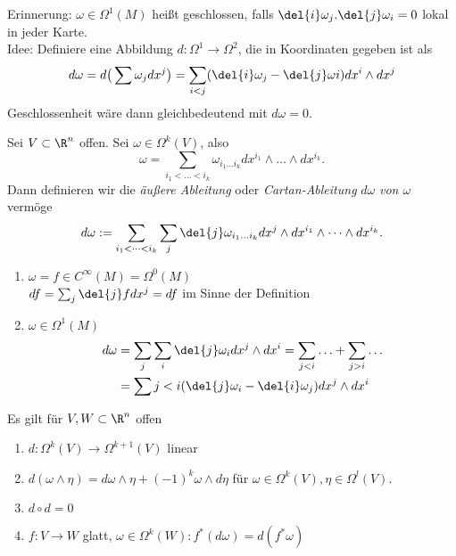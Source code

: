 Erinnerung: \lecture $ \omega \in \Omega^1(M) $ heißt geschlossen, falls $ \del{i}\omega_j . \del{j} \omega_i = 0 $ lokal in jeder Karte.\\
Idee: Definiere eine Abbildung $ d: \Omega^1 \to \Omega^2 $, die in Koordinaten gegeben ist als
\[ d\omega = d \big( \sum \omega_j dx^j \big) = \sum_{i < j} (\del{i} \omega_j - \del{j} \omega i) dx^i \wedge dx^j \]
Geschlossenheit wäre dann gleichbedeutend mit $d\omega = 0$.

\begin{defn}  \label{7.5}
	Sei $ V \subset \R^n $ offen. Sei $ \omega \in \Omega^k(V) $, also 
	\[ \omega = \sum_{i_1 < \dots < i_k} \omega_{i_1 \dots i_k} dx^{i_1} \wedge \dots \wedge dx^{i_k}. \]
	Dann definieren wir die \emph{äußere Ableitung} oder \emph{Cartan-Ableitung} $d\omega$ \emph{von $\omega$} vermöge
	\[ d\omega := \sum_{i_1 < \dots < i_k} \sum_j \del{j} \omega_{i_1 \dots i_k} dx^j \wedge dx^{i_1} \wedge \dots \wedge dx^{i_k}. \]
\end{defn}

\begin{rem*}
	\begin{enumerate}[label={\roman*})]
		\item $ \omega = f \in C^\infty(M) = \Omega^0(M) $\\
			$ df = \sum_j \del{j} f dx^j = df $ im Sinne der Definition
		\item $ \omega \in \Omega^1(M) $
			\begin{align*}
				d\omega &= \sum_j \sum_i \del{j}\omega_i dx^j \wedge dx^i = \sum_{j<i} \dotsc + \sum_{j > i} \dots\\
				&= \sum{j<i} (\del{j} \omega_i - \del{i}\omega_j) dx^j \wedge dx^i
			\end{align*}
	\end{enumerate}
\end{rem*}

\begin{lem}
	Es gilt für $ V,W \subset \R^n $ offen
	\begin{enumerate}[label={\roman*})]
		\item $ d: \Omega^k(V) \to \Omega^{k+1}(V) $ linear
		\item $ d(\omega \wedge \eta) = d\omega \wedge \eta + (-1)^k \omega \wedge d\eta $ für $ \omega \in \Omega^k(V), \eta \in \Omega^l(V). $
		\item $d \circ d = 0$
		\item $ f: V \to W $ glatt, $\omega \in \Omega^k(W): f^*(d\omega) = d(f^*\omega)$
	\end{enumerate}
\end{lem}

